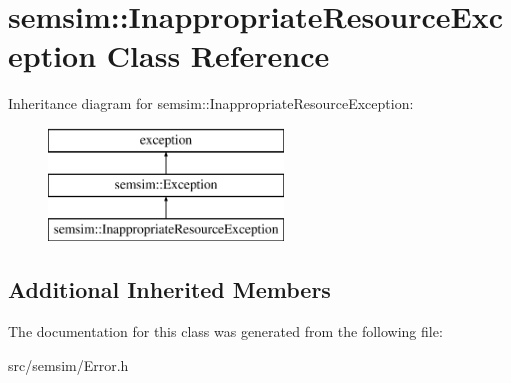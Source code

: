 \hypertarget{classsemsim_1_1InappropriateResourceException}{}\section{semsim\+:\+:Inappropriate\+Resource\+Exception Class Reference}
\label{classsemsim_1_1InappropriateResourceException}
Inheritance diagram for semsim\+:\+:Inappropriate\+Resource\+Exception\+:\begin{figure}[H]
\begin{center}
\leavevmode
\includegraphics[height=3.000000cm]{classsemsim_1_1InappropriateResourceException}
\end{center}
\end{figure}
\subsection*{Additional Inherited Members}


The documentation for this class was generated from the following file\+:\begin{DoxyCompactItemize}
\item 
src/semsim/Error.\+h\end{DoxyCompactItemize}
